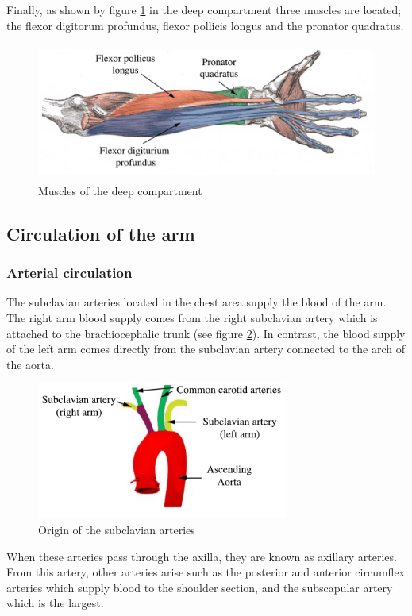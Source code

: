Finally, as shown by figure \ref{fig:forearm deep} in the deep compartment three muscles are located; the flexor digitorum profundus, flexor pollicis longus and the pronator quadratus.

\begin{figure}[!htpb]
	\centering
	\includegraphics[height=4.5cm,keepaspectratio]{figure17}
	\caption{Muscles of the deep compartment}
	\label{fig:forearm deep}
\end{figure}

\subsection{Circulation of the arm}
\subsubsection{Arterial circulation}
The subclavian arteries located in the chest area supply the blood of the arm.  The right arm blood supply comes from the right subclavian artery which is attached to the brachiocephalic trunk (see figure \ref{fig:subcalvian}). In contrast, the blood supply of the left arm comes directly from the subclavian artery connected to the arch of the aorta. 

\begin{figure}[!htpb]
	\centering
	\includegraphics[height=4.5cm,keepaspectratio]{figure18}
	\caption{Origin of the subclavian arteries}
	\label{fig:subcalvian}
\end{figure}

When these arteries pass through the axilla, they are known as axillary arteries. From this artery, other arteries arise such as the posterior and anterior circumflex arteries which supply blood to the shoulder section, and the subscapular artery which is the largest. 

